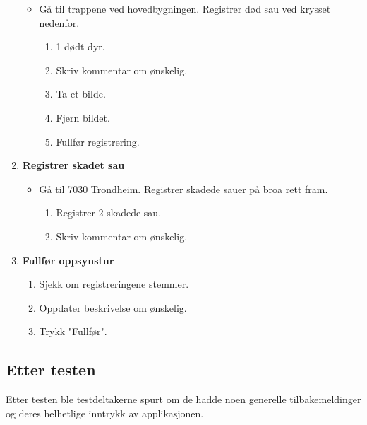 \begin{enumerate}[font=\bfseries]
\begin{itemize}
        \item Gå til trappene ved hovedbygningen. Registrer død sau ved krysset nedenfor. 
        \begin{enumerate}
            \item 1 dødt dyr.
            \item Skriv kommentar om ønskelig.
            \item Ta et bilde.
            \item Fjern bildet.
            \item Fullfør registrering.
        \end{enumerate}
    \end{itemize}
    \item \textbf{Registrer skadet sau}
    \begin{itemize}
        \item Gå til 7030 Trondheim. Registrer skadede sauer på broa rett fram.  
        \begin{enumerate}
            \item Registrer 2 skadede sau.
            \item Skriv kommentar om ønskelig.
        \end{enumerate}
    \end{itemize}
    \item \textbf{Fullfør oppsynstur}
    \begin{enumerate}
        \item Sjekk om registreringene stemmer.
        \item Oppdater beskrivelse om ønskelig.
        \item Trykk "Fullfør". 
    \end{enumerate}
\end{enumerate}

\subsection{Etter testen}
Etter testen ble testdeltakerne spurt om de hadde noen generelle tilbakemeldinger og deres helhetlige inntrykk av applikasjonen. 

